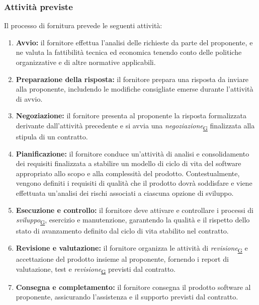 \documentclass[a4paper,12pt]{article}
\begin{document}
{{        \subsubsection{Attività previste}{
            Il processo di fornitura prevede le seguenti attività:
            \begin{enumerate}
                \item \textbf{Avvio:} il fornitore effettua l'analisi delle richieste da parte del proponente, e ne valuta la fattibilità tecnica ed economica tenendo conto delle politiche organizzative e di altre normative applicabili. 
                \item \textbf{Preparazione della risposta:} il fornitore prepara una risposta da inviare alla proponente, includendo le modifiche consigliate emerse durante l'attività di avvio.
                \item \textbf{Negoziazione:} il fornitore presenta al proponente la risposta formalizzata derivante dall'attività precedente e si avvia una \textit{negoziazione}\textsubscript{\href{https://atlasteam9.github.io/Atlas/glossario.html\#Negoziazione}{G}} finalizzata alla stipula di un contratto.
                \item \textbf{Pianificazione:} il fornitore conduce un'attività di analisi e consolidamento dei requisiti finalizzata a stabilire un modello di ciclo di vita del software appropriato allo scopo e alla complessità del prodotto. Contestualmente, vengono definiti i requisiti di qualità che il prodotto dovrà soddisfare e viene effettuata un'analisi dei rischi associati a ciascuna opzione di sviluppo. 
                \item \textbf{Esecuzione e controllo:} il fornitore deve attivare e controllare i processi di \textit{sviluppo}\textsubscript{\href{https://atlasteam9.github.io/Atlas/glossario.html\#Sviluppo}{G}}, esercizio e manutenzione, garantendo la qualità e il rispetto dello stato di avanzamento definito dal ciclo di vita stabilito nel contratto. 
                \item \textbf{Revisione e valutazione:} il fornitore organizza le attività di \textit{revisione}\textsubscript{\href{https://atlasteam9.github.io/Atlas/glossario.html\#Revisione}{G}} e accettazione del prodotto insieme al proponente, fornendo i report di valutazione, test e \textit{revisione}\textsubscript{\href{https://atlasteam9.github.io/Atlas/glossario.html\#Revisione}{G}} previsti dal contratto.
                \item \textbf{Consegna e completamento:} il fornitore consegna il prodotto software al proponente, assicurando l'assistenza e il supporto previsti dal contratto.
            \end{enumerate}
        }

}}
\end{document}
